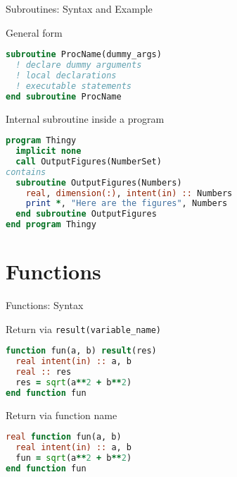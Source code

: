 \begin{frame}[fragile]{Subroutines: Syntax and Example}
  \begin{block}{General form}
\begin{lstlisting}[language=Fortran]
subroutine ProcName(dummy_args)
  ! declare dummy arguments
  ! local declarations
  ! executable statements
end subroutine ProcName
\end{lstlisting}
  \end{block}
  \begin{block}{Internal subroutine inside a program}
\begin{lstlisting}[language=Fortran]
program Thingy
  implicit none
  call OutputFigures(NumberSet)
contains
  subroutine OutputFigures(Numbers)
    real, dimension(:), intent(in) :: Numbers
    print *, "Here are the figures", Numbers
  end subroutine OutputFigures
end program Thingy
\end{lstlisting}
  \end{block}
\end{frame}

\section{Functions}

\begin{frame}[fragile]{Functions: Syntax}
\begin{block}{Return via \texttt{result(variable\_name)}}
\begin{lstlisting}[language=Fortran]
function fun(a, b) result(res)
  real intent(in) :: a, b
  real :: res
  res = sqrt(a**2 + b**2)
end function fun
\end{lstlisting}
\end{block}

\begin{block}{Return via function name}
\begin{lstlisting}[language=Fortran]
real function fun(a, b)
  real intent(in) :: a, b
  fun = sqrt(a**2 + b**2)
end function fun
\end{lstlisting}
\end{block}
\end{frame}

